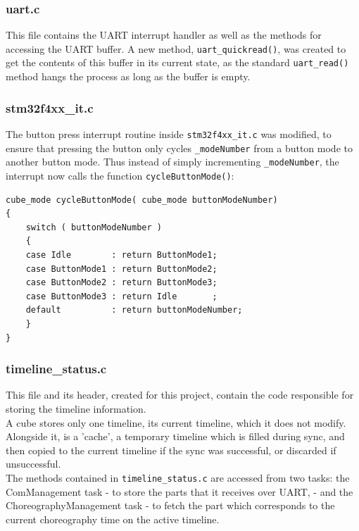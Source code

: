 \subsubsection{uart.c}

This file contains the UART interrupt handler as well as the methods for accessing the UART buffer. A new method, \texttt{uart\_quickread()}, was created to get the contents of this buffer in its current state, as the standard \texttt{uart\_read()} method hangs the process as long as the buffer is empty.

\subsubsection{stm32f4xx\_it.c}

The button press interrupt routine inside \texttt{stm32f4xx\_it.c} was modified, to ensure that pressing the button only cycles \texttt{\_modeNumber} from a button mode to another button mode. Thus instead of simply incrementing \texttt{\_modeNumber}, the interrupt now calls the function \texttt{cycleButtonMode()}:

\lstset{language=C,numbers=none}
\begin{lstlisting}[frame=lines]
cube_mode cycleButtonMode( cube_mode buttonModeNumber)
{
	switch ( buttonModeNumber )
	{
	case Idle		 : return ButtonMode1;
	case ButtonMode1 : return ButtonMode2;
	case ButtonMode2 : return ButtonMode3;
	case ButtonMode3 : return Idle       ;
	default 		 : return buttonModeNumber;
	}
}
\end{lstlisting}


\subsubsection{timeline\_status.c}

This file and its header, created for this project, contain the code responsible for storing the timeline information.\\

A cube stores only one timeline, its current timeline, which it does not modify. Alongside it, is a 'cache', a temporary timeline which is filled during sync, and then copied to the current timeline if the sync was successful, or discarded if unsuccessful.\\

The methods contained in \texttt{timeline\_status.c} are accessed from two tasks: the ComManagement task - to store the parts that it receives over UART, - and the ChoreographyManagement task - to fetch the part which corresponds to the current choreography time on the active timeline.\\

